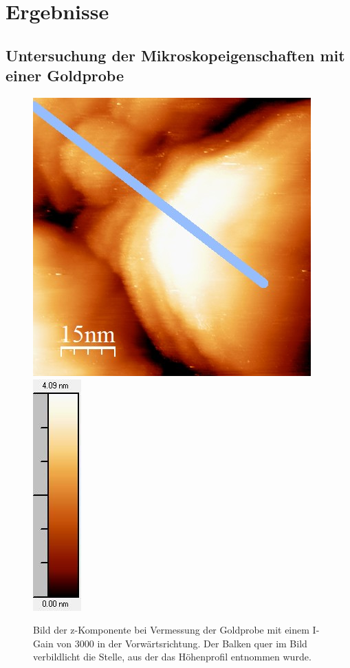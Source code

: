 \documentclass[12pt,a4paper]{article}
\begin{document}
\section{Ergebnisse}
\subsection{Untersuchung der Mikroskopeigenschaften mit einer Goldprobe}

\begin{figure}
\centering
\includegraphics[scale=0.8]{Bilder/Anhang/IGain/3000_IGain_vor.jpg}
\includegraphics[scale=0.8]{Bilder/Anhang/IGain/3000_IGain_vor_Skala.jpg}
\caption{Bild der z-Komponente bei Vermessung der Goldprobe mit einem I-Gain von 3000 in der Vorwärtsrichtung. Der Balken quer im Bild verbildlicht die Stelle, aus der das Höhenprofil entnommen wurde.}
\label{fig:Gold_IGain_Beispiel}
\end{figure}
\end{document}
